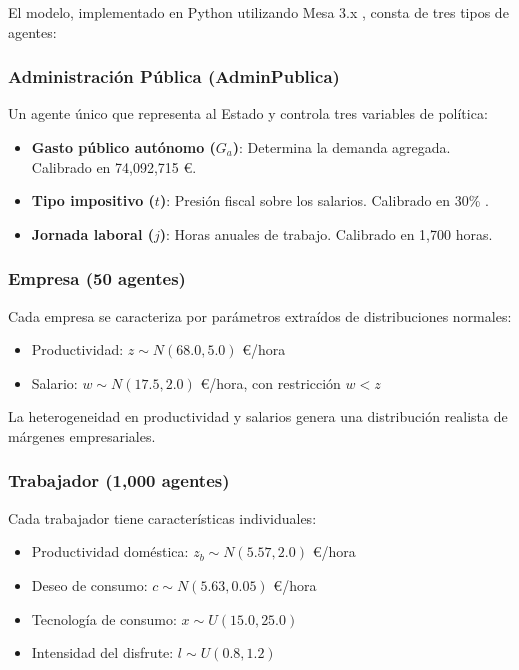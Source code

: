 El modelo, implementado en Python utilizando Mesa 3.x \cite{kazil2020mesa, mesa2024}, consta de tres tipos de agentes:

\subsubsection{Administración Pública (AdminPublica)}

Un agente único que representa al Estado y controla tres variables de política:
\begin{itemize}
    \item \textbf{Gasto público autónomo ($G_a$)}: Determina la demanda agregada. Calibrado en 74,092,715 €.
    \item \textbf{Tipo impositivo ($t$)}: Presión fiscal sobre los salarios. Calibrado en 30\% \cite{agenciatributaria2024}.
    \item \textbf{Jornada laboral ($j$)}: Horas anuales de trabajo. Calibrado en 1,700 horas.
\end{itemize}

\subsubsection{Empresa (50 agentes)}

Cada empresa se caracteriza por parámetros extraídos de distribuciones normales:
\begin{itemize}
    \item Productividad: $z \sim N(68.0, 5.0)$ €/hora \cite{eurostatProd2024}
    \item Salario: $w \sim N(17.5, 2.0)$ €/hora, con restricción $w < z$ \cite{ineSalario2024}
\end{itemize}

La heterogeneidad en productividad y salarios genera una distribución realista de márgenes empresariales.

\subsubsection{Trabajador (1,000 agentes)}

Cada trabajador tiene características individuales:
\begin{itemize}
    \item Productividad doméstica: $z_b \sim N(5.57, 2.0)$ €/hora
    \item Deseo de consumo: $c \sim N(5.63, 0.05)$ €/hora
    \item Tecnología de consumo: $x \sim U(15.0, 25.0)$
    \item Intensidad del disfrute: $l \sim U(0.8, 1.2)$
\end{itemize}

